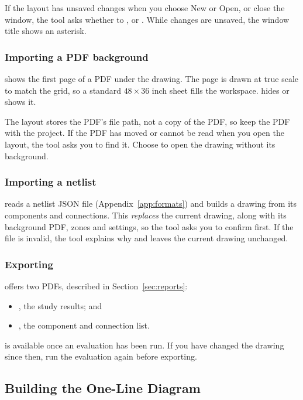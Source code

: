 If the layout has unsaved changes when you choose New or Open, or close the window,
the tool asks whether to ,  or . While changes are
unsaved, the window title shows an asterisk.

\subsubsection{Importing a PDF background}

 shows the first page of a PDF under the drawing. The page is
drawn at true scale to match the grid, so a standard $48 \times 36$ inch sheet fills
the workspace.  hides or shows it.

The layout stores the PDF's file path, not a copy of the PDF, so keep the PDF with the
project. If the PDF has moved or cannot be read when you open the layout, the tool
asks you to find it. Choose  to open the drawing without its background.

\subsubsection{Importing a netlist}

 reads a netlist JSON file (Appendix~\ref{app:formats})
and builds a drawing from its components and connections. This \emph{replaces} the
current drawing, along with its background PDF, zones and settings, so the tool asks
you to confirm first. If the file is invalid, the tool explains why and leaves the
current drawing unchanged.

\subsubsection{Exporting}

 offers two PDFs, described in Section~\ref{sec:reports}:
\begin{itemize}
  \item {}, the study results; and
  \item {}, the component and connection list.
\end{itemize}
 is available once an evaluation has been run. If you have changed
the drawing since then, run the evaluation again before exporting.

\subsection{Building the One-Line Diagram}\label{sec:building}

